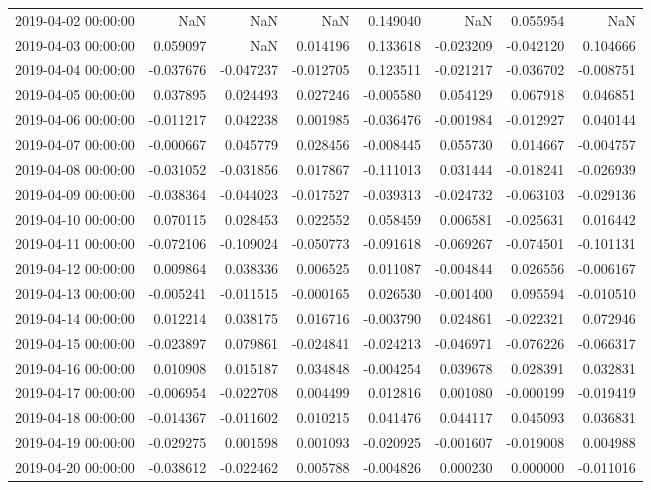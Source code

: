 \begin{tabular}{lrrrrrrr}
2019-04-02 00:00:00 & NaN & NaN & NaN & 0.149040 & NaN & 0.055954 & NaN \\
2019-04-03 00:00:00 & 0.059097 & NaN & 0.014196 & 0.133618 & -0.023209 & -0.042120 & 0.104666 \\
2019-04-04 00:00:00 & -0.037676 & -0.047237 & -0.012705 & 0.123511 & -0.021217 & -0.036702 & -0.008751 \\
2019-04-05 00:00:00 & 0.037895 & 0.024493 & 0.027246 & -0.005580 & 0.054129 & 0.067918 & 0.046851 \\
2019-04-06 00:00:00 & -0.011217 & 0.042238 & 0.001985 & -0.036476 & -0.001984 & -0.012927 & 0.040144 \\
2019-04-07 00:00:00 & -0.000667 & 0.045779 & 0.028456 & -0.008445 & 0.055730 & 0.014667 & -0.004757 \\
2019-04-08 00:00:00 & -0.031052 & -0.031856 & 0.017867 & -0.111013 & 0.031444 & -0.018241 & -0.026939 \\
2019-04-09 00:00:00 & -0.038364 & -0.044023 & -0.017527 & -0.039313 & -0.024732 & -0.063103 & -0.029136 \\
2019-04-10 00:00:00 & 0.070115 & 0.028453 & 0.022552 & 0.058459 & 0.006581 & -0.025631 & 0.016442 \\
2019-04-11 00:00:00 & -0.072106 & -0.109024 & -0.050773 & -0.091618 & -0.069267 & -0.074501 & -0.101131 \\
2019-04-12 00:00:00 & 0.009864 & 0.038336 & 0.006525 & 0.011087 & -0.004844 & 0.026556 & -0.006167 \\
2019-04-13 00:00:00 & -0.005241 & -0.011515 & -0.000165 & 0.026530 & -0.001400 & 0.095594 & -0.010510 \\
2019-04-14 00:00:00 & 0.012214 & 0.038175 & 0.016716 & -0.003790 & 0.024861 & -0.022321 & 0.072946 \\
2019-04-15 00:00:00 & -0.023897 & 0.079861 & -0.024841 & -0.024213 & -0.046971 & -0.076226 & -0.066317 \\
2019-04-16 00:00:00 & 0.010908 & 0.015187 & 0.034848 & -0.004254 & 0.039678 & 0.028391 & 0.032831 \\
2019-04-17 00:00:00 & -0.006954 & -0.022708 & 0.004499 & 0.012816 & 0.001080 & -0.000199 & -0.019419 \\
2019-04-18 00:00:00 & -0.014367 & -0.011602 & 0.010215 & 0.041476 & 0.044117 & 0.045093 & 0.036831 \\
2019-04-19 00:00:00 & -0.029275 & 0.001598 & 0.001093 & -0.020925 & -0.001607 & -0.019008 & 0.004988 \\
2019-04-20 00:00:00 & -0.038612 & -0.022462 & 0.005788 & -0.004826 & 0.000230 & 0.000000 & -0.011016 \\

\end{tabular}
